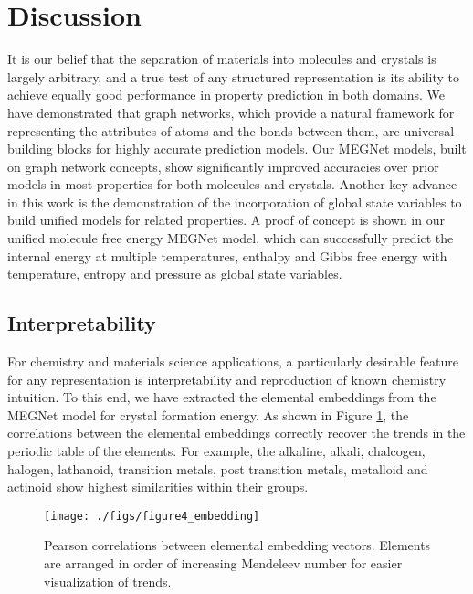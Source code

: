 \documentclass[manuscript=article]{achemso}
\begin{document}
\section{Discussion}

It is our belief that the separation of materials into molecules and crystals is largely arbitrary, and a true test of any structured representation is its ability to achieve equally good performance in property prediction in both domains. We have demonstrated that graph networks, which provide a natural framework for representing the attributes of atoms and the bonds between them, are universal building blocks for highly accurate prediction models. Our MEGNet models, built on graph network concepts, show significantly improved accuracies over prior models in most properties for both molecules and crystals. Another key advance in this work is the demonstration of the incorporation of global state variables to build unified models for related properties. A proof of concept is shown in our unified molecule free energy MEGNet model, which can successfully predict the internal energy at multiple temperatures, enthalpy and Gibbs free energy with temperature, entropy and pressure as global state variables. 

\subsection{Interpretability}

For chemistry and materials science applications, a particularly desirable feature for any representation is interpretability and reproduction of known chemistry intuition. To this end, we have extracted the elemental embeddings from the MEGNet model for crystal formation energy. As shown in Figure \ref{fig:embedding}, the correlations between the elemental embeddings correctly recover the trends in the periodic table of the elements. For example, the alkaline, alkali, chalcogen, halogen, lathanoid, transition metals, post transition metals, metalloid and actinoid show highest similarities within their groups. 

\begin{figure}[htp]
\texttt{[image: ./figs/figure4\_embedding]}
\caption{\label{fig:embedding}Pearson correlations between elemental embedding vectors. Elements are arranged in order of increasing Mendeleev number\cite{pettifor1988structure} for easier visualization of trends.} 
\end{figure}
\end{document}
